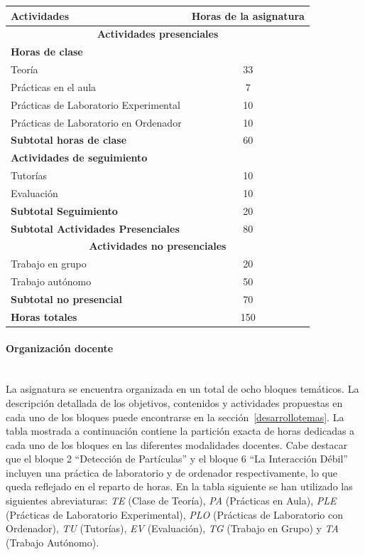 \begin{center}
\begin{tabular}{|l|c|}
\hline\hline
\textbf{Actividades} & \textbf{Horas de la asignatura} \\
\hline\hline
\multicolumn{2}{|c|}{\textbf{Actividades presenciales}}\\
\hline\hline
\multicolumn{2}{|l|}{\textbf{Horas de clase}}\\
\hline
Teoría & 33 \\
\hline
Prácticas en el aula & 7 \\
\hline
Prácticas de Laboratorio Experimental & 10 \\
\hline
Prácticas de Laboratorio en Ordenador & 10 \\
\hline\hline
\textbf{Subtotal horas de clase} & 60 \\
\hline\hline
\multicolumn{2}{|l|}{\textbf{Actividades de seguimiento}}\\
\hline
Tutorías & 10 \\
\hline
Evaluación & 10 \\
\hline\hline
\textbf{Subtotal Seguimiento} & 20 \\
\hline\hline
\textbf{Subtotal Actividades Presenciales} & 80 \\
\hline\hline
\multicolumn{2}{|c|}{\textbf{Actividades no presenciales}}\\
\hline\hline
Trabajo en grupo & 20 \\
\hline
Trabajo autónomo & 50 \\
\hline\hline
\textbf{Subtotal no presencial} & 70 \\
\hline\hline
\textbf{Horas totales} & 150 \\
\hline\hline
\end{tabular}
\end{center}

\paragraph{Organización docente\\\\}

La asignatura se encuentra organizada en un total de ocho bloques temáticos. La descripción detallada de los objetivos, contenidos y actividades propuestas en cada uno de los bloques puede encontrarse en la sección~\ref{desarrollotemas}. La tabla mostrada a continuación contiene la partición exacta de horas dedicadas a cada uno de los bloques en las diferentes modalidades docentes. Cabe destacar que el bloque 2 ``Detección de Partículas'' y el bloque 6 ``La Interacción Débil'' incluyen una práctica de laboratorio y de ordenador respectivamente, lo que queda reflejado en el reparto de horas. En la tabla siguiente se han utilizado las siguientes abreviaturas: \emph{TE} (Clase de Teoría), \emph{PA} (Prácticas en Aula), \emph{PLE} (Prácticas de Laboratorio Experimental), \emph{PLO} (Prácticas de Laboratorio con Ordenador), \emph{TU} (Tutorías), \emph{EV} (Evaluación), \emph{TG} (Trabajo en Grupo) y \emph{TA} (Trabajo Autónomo).

